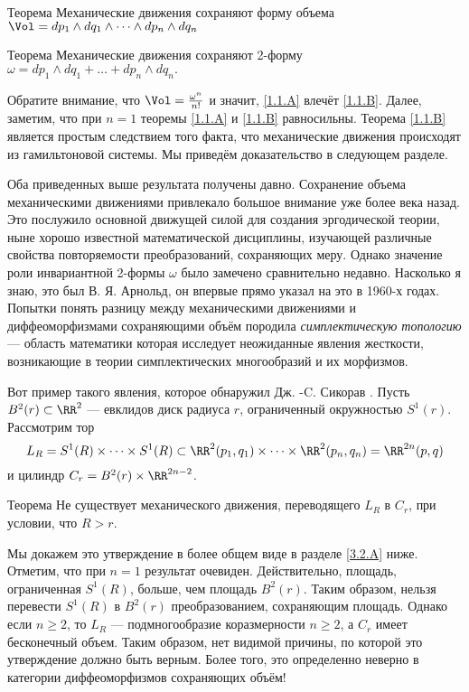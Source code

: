 \begin{thm}{Теорема}\label{1.1.A}
Механические движения сохраняют форму объема 
$\Vol=dp_1\wedge dq_1\wedge\dots\wedge d p_n\wedge dq_n$
\end{thm}

\begin{thm}{Теорема}\label{1.1.B}
Механические движения сохраняют 2-форму $\omega = dp_1 \wedge dq_1 +\dots
+ dp_n \wedge dq_n.$
\end{thm}

Обратите внимание, что $\Vol = \tfrac{\omega^n}{n!}$ и значит, \ref{1.1.A} влечёт \ref{1.1.B}.
Далее, заметим, что при $n = 1$ теоремы \ref{1.1.A} и \ref{1.1.B} равносильны.
Теорема \ref{1.1.B} является простым следствием того факта, что механические движения происходят из гамильтоновой системы.
Мы приведём доказательство в следующем разделе.

Оба приведенных выше результата получены давно.
Сохранение объема механическими движениями привлекало большое внимание уже более века назад.
Это послужило основной движущей силой для создания эргодической теории, ныне хорошо известной математической дисциплины, изучающей различные свойства повторяемости преобразований, сохраняющих меру.
Однако значение роли инвариантной 2-формы $\omega$ было замечено сравнительно недавно.
Насколько я знаю, это был В. Я. Арнольд, он впервые прямо указал на это в 1960-х годах.
Попытки понять разницу между механическими движениями и диффеоморфизмами сохраняющими объём породила \emph{симплектическую топологию} --- область математики которая исследует неожиданные явления жесткости, возникающие в теории симплектических многообразий и их морфизмов.

Вот пример такого явления, которое обнаружил Дж. -C. Сикорав \cite{S1}.
Пусть $B^2(r) \subset \RR^2$ --- евклидов диск радиуса $r$, ограниченный окружностью $S^1(r)$.
Рассмотрим тор 
\[L_R = 
S^1 (R) \times\dots\times S^1(R) \subset \RR^2 (p_1, q_1) \times\dots\times \RR^2 (p_n, q_n) =\RR^{2n} (p, q)\]
и цилиндр $C_r = B^2 (r) \times \RR^{2n-2}$.

\begin{thm}{Теорема}\label{1.1.C}
Не существует механического движения, переводящего $L_R$ в $C_r$, при условии, что $R>r$.
\end{thm}

Мы докажем это утверждение в более общем виде в разделе \ref{3.2.A} ниже.
Отметим, что при $n = 1$ результат очевиден.
Действительно, площадь, ограниченная $S^1 (R)$, больше, чем площадь $B^2 (r)$.
Таким образом, нельзя перевести $S^1(R)$ в $B^2(r)$ преобразованием, сохраняющим площадь.
Однако если $n \ge 2$, то $L_R$ --- подмногообразие коразмерности $n \ge 2$, а $C_r$ имеет бесконечный объем.
Таким образом, нет видимой причины, по которой это утверждение должно быть верным.
Более того, это определенно неверно в категории диффеоморфизмов сохраняющих объём!

